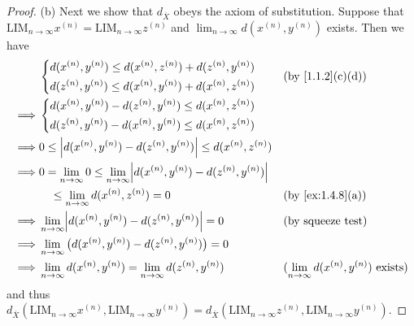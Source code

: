 \begin{proof}{(b)}
  Next we show that \(d_{\overline{X}}\) obeys the axiom of substitution.
  Suppose that \(\text{LIM}_{n \to \infty} x^{(n)} = \text{LIM}_{n \to \infty} z^{(n)}\) and \(\lim_{n \to \infty} d(x^{(n)}, y^{(n)})\) exists.
  Then we have
  \begin{align*}
             & \begin{dcases}
                 d(x^{(n)}, y^{(n)}) \leq d(x^{(n)}, z^{(n)}) + d(z^{(n)}, y^{(n)}) \\
                 d(z^{(n)}, y^{(n)}) \leq d(x^{(n)}, y^{(n)}) + d(x^{(n)}, z^{(n)})
               \end{dcases}                              &  & \text{(by \cref{1.1.2}(c)(d))}                                                                                       \\
    \implies & \begin{dcases}
                 d(x^{(n)}, y^{(n)}) - d(z^{(n)}, y^{(n)}) \leq d(x^{(n)}, z^{(n)}) \\
                 d(z^{(n)}, y^{(n)}) - d(x^{(n)}, y^{(n)}) \leq d(x^{(n)}, z^{(n)})
               \end{dcases}                                                                                                  \\
    \implies & 0 \leq \abs{d(x^{(n)}, y^{(n)}) - d(z^{(n)}, y^{(n)})} \leq d(x^{(n)}, z^{(n)})                                                                                     \\
    \implies & 0 = \lim_{n \to \infty} 0 \leq \lim_{n \to \infty} \abs{d(x^{(n)}, y^{(n)}) - d(z^{(n)}, y^{(n)})}                                                                  \\
             & \quad \leq \lim_{n \to \infty} d(x^{(n)}, z^{(n)}) = 0                                             &  & \text{(by \cref{ex:1.4.8}(a))}                              \\
    \implies & \lim_{n \to \infty} \abs{d(x^{(n)}, y^{(n)}) - d(z^{(n)}, y^{(n)})} = 0                            &  & \text{(by squeeze test)}                                    \\
    \implies & \lim_{n \to \infty} \big(d(x^{(n)}, y^{(n)}) - d(z^{(n)}, y^{(n)})\big) = 0                                                                                         \\
    \implies & \lim_{n \to \infty} d(x^{(n)}, y^{(n)}) = \lim_{n \to \infty} d(z^{(n)}, y^{(n)})                  &  & \text{(\(\lim_{n \to \infty} d(x^{(n)}, y^{(n)})\) exists)}
  \end{align*}
  and thus \(d_{\overline{X}}(\text{LIM}_{n \to \infty} x^{(n)}, \text{LIM}_{n \to \infty} y^{(n)}) = d_{\overline{X}}(\text{LIM}_{n \to \infty} z^{(n)}, \text{LIM}_{n \to \infty} y^{(n)})\).


\end{proof}
